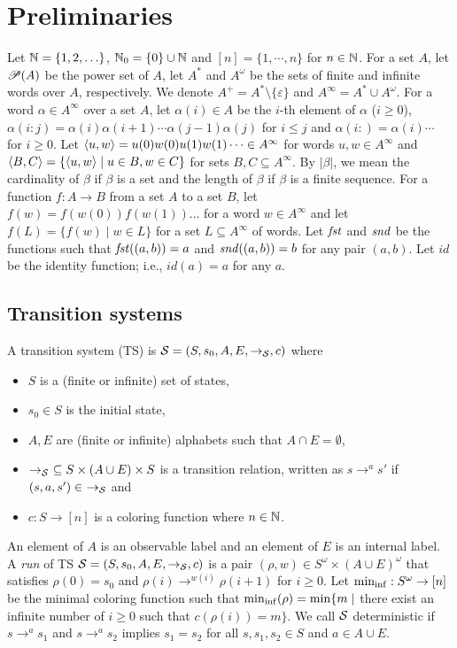 \section{Preliminaries}
Let $\mathbb{N}=\{1,2,\ldots\}$, $\mathbb{N}_0=\{0\} \cup \mathbb{N}$ and $[n]=\{1,\cdots,n\}$ for $n\in\mathbb{N}$.
For a set $A$, let $\mathscr{P}(A)$ be the power set of $A$,
let $A^*$ and $A^\omega$ be the sets of finite and infinite words over $A$, respectively.
We denote $A^+ = A^*\setminus\{\varepsilon\}$ and
$A^\infty = A^* \cup A^\omega$.
For a word $\alpha\in A^\infty$ over a set $A$,
let $\alpha(i)\in A$ be the $i$-th element of $\alpha$ ($i\geq 0$),
$\alpha(i:j)=\alpha(i)\alpha(i+1)\cdots\alpha(j-1)\alpha(j)$ for $i\leq j$
and $\alpha(i:)=\alpha(i)\cdots$ for $i\geq 0$.
Let $\langle u, w\rangle = u(0)w(0)u(1)w(1)\cdots \in A^\infty$ for words $u,w\in A^\infty$ and $\langle B, C\rangle = \{\langle u, w\rangle\mid u\in B, w\in C\}$ for sets $B, C\subseteq A^\infty$.
By $|\beta|$, we mean the cardinality of $\beta$ if $\beta$ is a set
and the length of $\beta$ if $\beta$ is a finite sequence.
For a function $f:A\to B$ from a set $A$ to a set $B$,
let $f(w)=f(w(0))f(w(1))\ldots$ for a word $w\in A^{\infty}$
and let $f(L)=\{f(w)\mid w\in L\}$ for a set $L\subseteq A^{\infty}$
of words.
Let $\mathit{fst}$ and $\mathit{snd}$ be the functions such that $\mathit{fst}((a,b))=a$ and $\mathit{snd}((a,b))=b$ for any pair $(a,b)$.
Let $\mathit{id}$ be the identity function; i.e.,
$\mathit{id}(a)=a$ for any $a$.

\subsection{Transition systems}
\begin{definition}
A {transition system} (TS)
is ${\cal S}=(S, s_0, A, E, \to_{\cal S}, c)$ where
\begin{itemize}
\item $S$ is a (finite or infinite) set of states,
\item $s_0\in S$ is the initial state,
\item $A, E$ are (finite or infinite) alphabets such that $A\cap E = \emptyset$,
\item $\to_{\cal S}\ \subseteq S\times(A\cup E)\times S$ is a transition relation, written as $s\to^a s'$ if $(s,a,s')\in\ \to_{\cal S}$ and
\item $c: S \to [n]$ is a coloring function where $n\in \mathbb{N}$.
\end{itemize}
\end{definition}
An element of $A$ is an observable label and an element of $E$ is an internal label.
A \emph{run} of TS ${\cal S}=(S, s_0, A, E, \to_{\cal S}, c)$ is
a pair $(\rho, w)\in S^\omega \times (A\cup E)^\omega$ that satisfies
$\rho(0)=s_0$ and $\rho(i)\to^{w(i)}\rho(i+1)$ for $i\geq 0$.
Let ${\rm min_{inf}}: S^\omega \to [n]$ be the minimal coloring function such that
${\rm min_{inf}}(\rho)={\rm min}\{m\mid$ there exist an infinite number of $i\geq 0$ such that $c(\rho(i)) = m\}$.
We call ${\cal S}$ deterministic if $s\to^a s_1$ and $s\to^a s_2$ implies $s_1=s_2$ for all $s,s_1,s_2\in S$ and $a\in A\cup E$.

